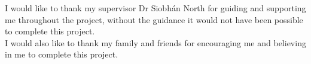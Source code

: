 \documentclass[../main.tex]{subfiles}
\begin{document}
\raggedright

I would like to thank my supervisor Dr Siobhán North for guiding and supporting me throughout the project, without the guidance it would not have been possible to complete this project. \\[2mm]
I would also like to thank my family and friends for encouraging me and believing in me to complete this project. 
\end{document}
